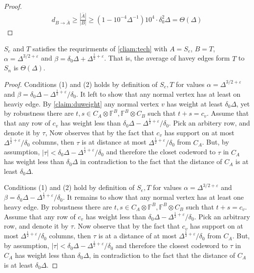 \begin{proof}
   \begin{equation*}
     \begin{split}
       d_{B\rightarrow \bar{A}}  \ge \frac{|\bar{A}|}{|B|} \ge \left( 1 - 10^{-4}\Delta^{-1}  \right) 10^{4} \cdot \delta^{2}_{0}\Delta  = \Theta\left( \Delta \right)
     \end{split}
   \end{equation*}
 \end{proof}
 
 \begin{claim}
   \label{claim:satis}
   $S_{e}$ and $T$ satisfies the requrirments of \cref{cliam:tech} with $A = S_{e}$, $B = T$, $\alpha = \Delta^{3/2 + \varepsilon}$ and $\beta = \delta_{0}\Delta + \Delta^{\frac{1}{2} + \varepsilon}$. That is, the average of havey edges form $T$ to $S_{n}$ is $\Theta\left( \Delta \right)$. 
 \end{claim}

 \begin{proof}
   Conditions (1) and (2) holds by definition of $S_{e},T$ for values $\alpha = \Delta^{3/2 + \varepsilon}$ and $\beta = \delta_{0}\Delta - \Delta^{\frac{1}{2}+\varepsilon}/\delta_{0}$. It left to show that any normal vertex has at least on heaviy edge. By \cref{claim:duweight} any normal vertex $v$ has weight at least $\delta_{0}\Delta$, yet by robustness there are $t,s \in C_{A}\otimes \mathbb{F}^{B}, \mathbb{F}^{B}\otimes  C_{B}$ such that $t+s = c_{v}$. Assume that that any row of $c_{v}$ has weight less than $\delta_{0}\Delta - \Delta^{\frac{1}{2}+\varepsilon}/\delta_{0}$. Pick an arbitery row, and denote it by $\tau$, Now observes that by the fact that $c_{v}$ has support on at most $\Delta^{\frac{1}{2}+\varepsilon}/\delta_{0}$ columns, then $\tau$ is at distance at most $\Delta^{\frac{1}{2}+\varepsilon}/\delta_{0}$ from $C_{A}$. But, by assumption, $|\tau| < \delta_{0}\Delta -\Delta^{\frac{1}{2}+\varepsilon}/\delta_{0}$ and therefore the closet codeword to $\tau$ in $C_{A}$ has weight less than  $\delta_{0}\Delta$ in contradiction to the fact that the distance of $C_{A}$ is at least $\delta_{0}\Delta$.  

Conditions (1) and (2) hold by definition of $S_e,T$ for values $\alpha = \Delta^{3/2 + \varepsilon}$ and $\beta = \delta_{0}\Delta - \Delta^{\frac{1}{2}+\varepsilon}/\delta_{0}$. It remains to show that any normal vertex has at least one heavy edge. By robustness there are $t,s \in C_{A}\otimes \mathbb{F}^{B}, \mathbb{F}^{B}\otimes  C_{B}$ such that $t+s = c_{v}$. Assume that any row of $c_{v}$ has weight less than $\delta_{0}\Delta - \Delta^{\frac{1}{2}+\varepsilon}/\delta_{0}$. Pick an arbitrary row, and denote it by $\tau$. Now observe that by the fact that $c_{v}$ has support on at most $\Delta^{\frac{1}{2}+\varepsilon}/\delta_{0}$ columns, then $\tau$ is at a distance of at most $\Delta^{\frac{1}{2}+\varepsilon}/\delta_{0}$ from $C_{A}$. But, by assumption, $|\tau| < \delta_{0}\Delta -\Delta^{\frac{1}{2}+\varepsilon}/\delta_{0}$ and therefore the closest codeword to $\tau$ in $C_{A}$ has weight less than $\delta_{0}\Delta$, in contradiction to the fact that the distance of $C_{A}$ is at least $\delta_{0}\Delta$.
 \end{proof}

